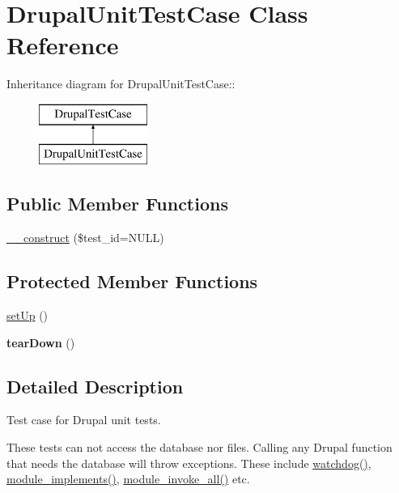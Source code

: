 \hypertarget{classDrupalUnitTestCase}{
\section{DrupalUnitTestCase Class Reference}
\label{classDrupalUnitTestCase}
}
Inheritance diagram for DrupalUnitTestCase::\begin{figure}[H]
\begin{center}
\leavevmode
\includegraphics[height=2cm]{classDrupalUnitTestCase}
\end{center}
\end{figure}
\subsection*{Public Member Functions}
\begin{DoxyCompactItemize}
\item 
\hyperlink{classDrupalUnitTestCase_a90ea280099eab5b03f4584e04c2b38dc}{\_\-\_\-construct} (\$test\_\-id=NULL)
\end{DoxyCompactItemize}
\subsection*{Protected Member Functions}
\begin{DoxyCompactItemize}
\item 
\hyperlink{classDrupalUnitTestCase_a120dccfa92782522c64da39aaa1d49ab}{setUp} ()
\item 
\hypertarget{classDrupalUnitTestCase_a99a2f68e986418daa2e2d461d7d95bf1}{
{\bfseries tearDown} ()}
\label{classDrupalUnitTestCase_a99a2f68e986418daa2e2d461d7d95bf1}

\end{DoxyCompactItemize}


\subsection{Detailed Description}
Test case for Drupal unit tests.

These tests can not access the database nor files. Calling any Drupal function that needs the database will throw exceptions. These include \hyperlink{bootstrap_8inc_acb7338e6740302727043d64e3ae1257b}{watchdog()}, \hyperlink{group__hooks_ga9191200072f2a641829e9d3c2759561f}{module\_\-implements()}, \hyperlink{group__hooks_gabedb5f566ef5faaa5768dd15125b111c}{module\_\-invoke\_\-all()} etc. 

